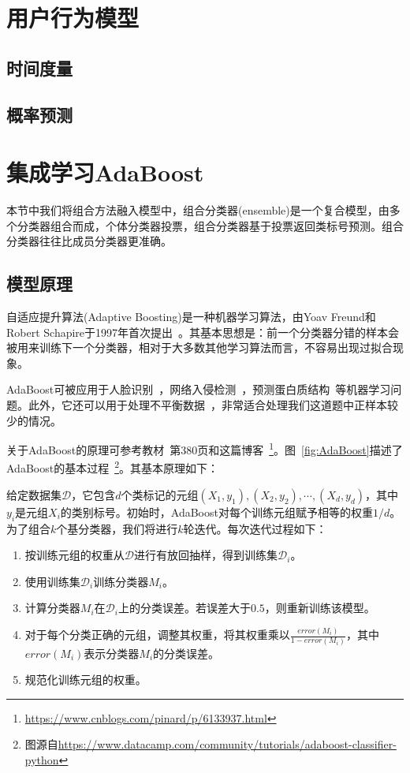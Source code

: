 \documentclass[12pt]{article} %
\newcommand\calD{\mathcal{D}}
\newcommand\XX{\boldsymbol{\mathit{X}}}
\begin{document}
\begin{sloppypar}
\newpage
\section{用户行为模型}

\subsection{时间度量}

\subsection{概率预测}


\newpage
\section{集成学习AdaBoost}

本节中我们将组合方法融入模型中，组合分类器(ensemble)是一个复合模型，由多个分类器组合而成，个体分类器投票，组合分类器基于投票返回类标号预测。组合分类器往往比成员分类器更准确。

\subsection{模型原理}

自适应提升算法(Adaptive Boosting)是一种机器学习算法，由Yoav Freund和Robert Schapire于1997年首次提出~\cite{freund1997decision}。其基本思想是：前一个分类器分错的样本会被用来训练下一个分类器，相对于大多数其他学习算法而言，不容易出现过拟合现象。

AdaBoost可被应用于人脸识别~\cite{wu2004fast}，网络入侵检测~\cite{hu2008adaboost}，预测蛋白质结构~\cite{niu2006predicting}等机器学习问题。此外，它还可以用于处理不平衡数据~\cite{viola2002fast}，非常适合处理我们这道题中正样本较少的情况。

关于AdaBoost的原理可参考教材~\cite{han2011data}第380页和这篇博客~\footnote{\url{https://www.cnblogs.com/pinard/p/6133937.html}}。图~\ref{fig:AdaBoost}描述了AdaBoost的基本过程~\footnote{图源自\url{https://www.datacamp.com/community/tutorials/adaboost-classifier-python}}。其基本原理如下：

给定数据集$\calD$，它包含$d$个类标记的元组$(\XX_1, y_1), (\XX_2, y_2), \cdots, (\XX_d, y_d)$，其中$y_i$是元组$\XX_i$的类别标号。初始时，AdaBoost对每个训练元组赋予相等的权重$1/d$。为了组合$k$个基分类器，我们将进行$k$轮迭代。每次迭代过程如下：
\begin{enumerate}
\item 按训练元组的权重从$\calD$进行有放回抽样，得到训练集$\calD_i$。
\item 使用训练集$\calD_i$训练分类器$M_i$。
\item 计算分类器$M_i$在$\calD_i$上的分类误差。若误差大于$0.5$，则重新训练该模型。
\item 对于每个分类正确的元组，调整其权重，将其权重乘以$\frac{error(M_i)}{1 - error(M_i)}$，其中$error(M_i)$表示分类器$M_i$的分类误差。
\item 规范化训练元组的权重。
\end{enumerate}


\end{sloppypar}
\end{document}
